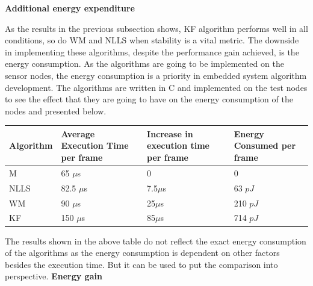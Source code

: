 \documentclass[a4paper,10pt]{report}
\begin{document}
\textbf{Additional energy expenditure}\par \noindent
As the results in the previous subsection shows, KF algorithm performs well in all conditions, so do WM and NLLS when stability is a vital metric. The downside in implementing these algorithms, despite the performance gain achieved, is the energy consumption. As the algorithms are going to be implemented on the sensor nodes, the energy consumption is a priority in embedded system algorithm development. The algorithms are written in C and implemented on the test nodes to see the effect that they are going to have on the energy consumption of the nodes and presented below.
\begin{center}
    \begin{tabular}{ |p{1.5cm} | p{2cm} |p{2cm} |p{1.75cm} | }
    \hline
    Algorithm & Average Execution Time per frame & Increase in execution time per frame & Energy Consumed per frame \\ \hline
    M &  65 $\mu$s & 0 & 0  \\ \hline
    NLLS & 82.5 $\mu$s & 7.5$\mu$s & 63 $pJ$  \\ \hline
    WM &   90 $\mu$s & 25$\mu$s & 210 $pJ$ \\ \hline
    KF &  150 $\mu$s  & 85$\mu$s &  714 $pJ$\\ \hline
    \end{tabular}
\label{tab}
\end{center}
The results shown in the above table do not reflect the exact energy consumption of the algorithms as the energy consumption is dependent on other factors besides the execution time. But it can be used to put the comparison into perspective. \newline
\textbf{Energy gain}\par \noindent
\end{document}
